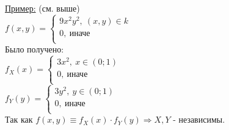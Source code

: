 \underline{Пример:} (см. выше)\\
$f(x,y) = 
\begin{cases}
	9 x^2 y^2, \ (x,y) \in k\\
	0, \ \text{иначе}\\
\end{cases}$\\
Было получено:\\
$f_X(x) = 
\begin{cases}
	3x^2, \ x \in (0;1)\\
	0, \ \text{иначе}\\
\end{cases}$\\
$f_Y(y) = 
\begin{cases}
	3y^2, \ y \in (0;1)\\
	0, \ \text{иначе}\\
\end{cases}$\\
Так как $f(x,y) \equiv f_X(x) \cdot f_Y(y) \Rightarrow X,Y$ - независимы.\\

























